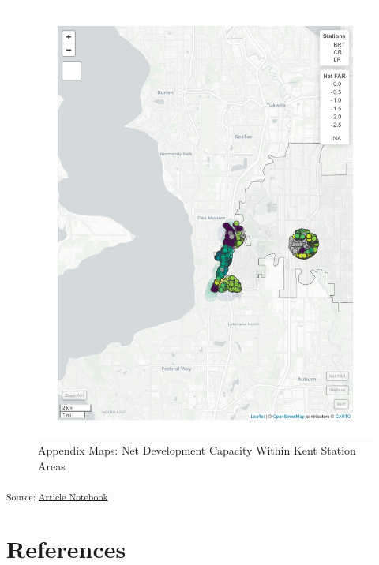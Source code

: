 \documentclass[
]{agujournal2019}
\begin{document}
\begin{figure}[H]

{\centering \includegraphics{index_files/figure-pdf/appendix-case-studies-kent-parcels-1.pdf}

}

\caption{Appendix Maps: Net Development Capacity Within Kent Station
Areas}

\end{figure}%

\textsubscript{Source:
\href{https://tiernanmartin.github.io/2024-transit-oriented-development-bill/index.qmd.html}{Article
Notebook}}

\section*{References}\label{references}
\end{document}
